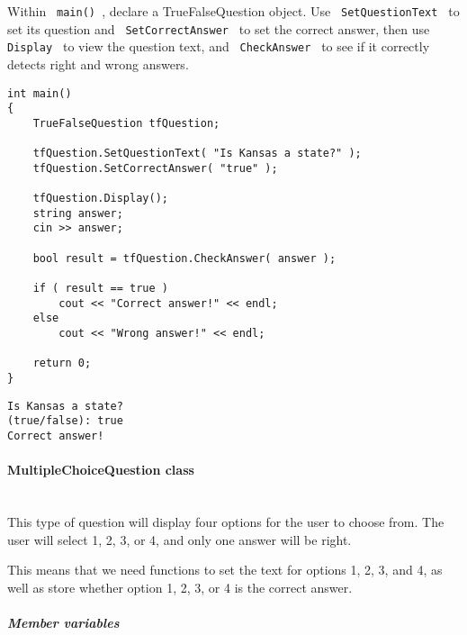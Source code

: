 \documentclass[a4paper,12pt]{book}
\begin{document}
                        Within \texttt{ main() }, declare a TrueFalseQuestion object.
                        Use \texttt{ SetQuestionText } to set its question and
                        \texttt{ SetCorrectAnswer } to set the correct answer,
                        then use \texttt{ Display } to view the question text,
                        and \texttt{ CheckAnswer } to see if it correctly detects
                        right and wrong answers. \newpage

\begin{lstlisting}[style=code]
int main()
{
    TrueFalseQuestion tfQuestion;

    tfQuestion.SetQuestionText( "Is Kansas a state?" );
    tfQuestion.SetCorrectAnswer( "true" );

    tfQuestion.Display();
    string answer;
    cin >> answer;

    bool result = tfQuestion.CheckAnswer( answer );

    if ( result == true )
        cout << "Correct answer!" << endl;
    else
        cout << "Wrong answer!" << endl;

    return 0;
}
\end{lstlisting}

\begin{lstlisting}[style=output]
Is Kansas a state?
(true/false): true
Correct answer!
\end{lstlisting}

                    \newpage
                    \paragraph{ MultipleChoiceQuestion class } ~\\
                        This type of question will display four options
                        for the user to choose from. The user will select
                        1, 2, 3, or 4, and only one answer will be right.
                        
                        This means that we need functions to set the
                        text for options 1, 2, 3, and 4, as well as
                        store whether option 1, 2, 3, or 4 is the
                        correct answer.

                        \subparagraph{ Member variables } ~\\
                            
\end{document}
